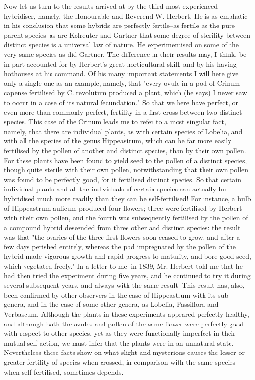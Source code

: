 Now let us turn to the results arrived at by the third most experienced hybridiser, namely, the Honourable and Reverend W. Herbert. He is as emphatic in his conclusion that some hybrids are perfectly fertile--as fertile as the pure parent-species--as are Kolreuter and Gartner that some degree of sterility between distinct species is a universal law of nature. He experimentised on some of the very same species as did Gartner. The difference in their results may, I think, be in part accounted for by Herbert's great horticultural skill, and by his having hothouses at his command. Of his many important statements I will here give only a single one as an example, namely, that "every ovule in a pod of Crinum capense fertilised by C. revolutum produced a plant, which (he says) I never saw to occur in a case of its natural fecundation." So that we here have perfect, or even more than commonly perfect, fertility in a first cross between two distinct species.
This case of the Crinum leads me to refer to a most singular fact, namely, that there are individual plants, as with certain species of Lobelia, and with all the species of the genus Hippeastrum, which can be far more easily fertilised by the pollen of another and distinct species, than by their own pollen. For these plants have been found to yield seed to the pollen of a distinct species, though quite sterile with their own pollen, notwithstanding that their own pollen was found to be perfectly good, for it fertilised distinct species. So that certain individual plants and all the individuals of certain species can actually be hybridised much more readily than they can be self-fertilised! For instance, a bulb of Hippeastrum aulicum produced four flowers; three were fertilised by Herbert with their own pollen, and the fourth was subsequently fertilised by the pollen of a compound hybrid descended from three other and distinct species: the result was that "the ovaries of the three first flowers soon ceased to grow, and after a few days perished entirely, whereas the pod impregnated by the pollen of the hybrid made vigorous growth and rapid progress to maturity, and bore good seed, which vegetated freely." In a letter to me, in 1839, Mr. Herbert told me that he had then tried the experiment during five years, and he continued to try it during several subsequent years, and always with the same result. This result has, also, been confirmed by other observers in the case of Hippeastrum with its sub-genera, and in the case of some other genera, as Lobelia, Passiflora and Verbascum. Although the plants in these experiments appeared perfectly healthy, and although both the ovules and pollen of the same flower were perfectly good with respect to other species, yet as they were functionally imperfect in their mutual self-action, we must infer that the plants were in an unnatural state. Nevertheless these facts show on what slight and mysterious causes the lesser or greater fertility of species when crossed, in comparison with the same species when self-fertilised, sometimes depends.
